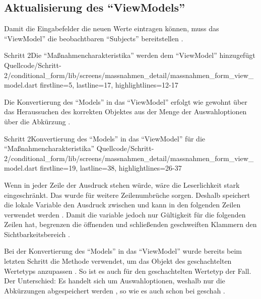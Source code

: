 \subsection{Aktualisierung des \enquote{ViewModels}}

Damit die Eingabefelder die neuen Werte eintragen können, muss das \enquote{ViewModel} die beobachtbaren \enquote{Subjects} bereitstellen . 

\begin{alexlisting}{Schritt 2}{Die \enquote{Maßnahmencharakteristika} werden dem \enquote{ViewModel} hinzugefügt}
  {Quellcode/Schritt-2/conditional_form/lib/screens/massnahmen_detail/massnahmen_form_view_model.dart}
  {firstline=5, lastline=17, highlightlines={12-17}}
  \label{lst:Schritt2MassnahmencharakteristikaWerdenDemViewModelHinzugefuegt}
\end{alexlisting}


Die Konvertierung des \enquote{Models} in das \enquote{ViewModel} erfolgt wie gewohnt über das Heraussuchen des korrekten Objektes aus der Menge der Auswahloptionen über die Abkürzung .

\begin{alexlisting}{Schritt 2}{Konvertierung des \enquote{Models} in das \enquote{ViewModel} für die \enquote{Maßnahmencharakteristika}}
  {Quellcode/Schritt-2/conditional_form/lib/screens/massnahmen_detail/massnahmen_form_view_model.dart}
  {firstline=19, lastline=38, highlightlines={26-37}}
  \label{lst:Schritt2KonvertierungDesModelsInDasViewModel}
\end{alexlisting}

Wenn in jeder Zeile der Ausdruck  stehen würde, wäre die Leserlichkeit stark eingeschränkt. Das wurde für weitere Zeilenumbrüche sorgen. Deshalb speichert die lokale Variable  den Ausdruck zwischen und kann in den folgenden Zeilen verwendet werden .
Damit die variable  jedoch nur Gültigkeit für die folgenden Zeilen hat, begrenzen die öffnenden und schließenden geschweiften Klammern den Sichtbarkeitsbereich .

Bei der Konvertierung des \enquote{Models} in das \enquote{ViewModel} wurde bereits beim letzten Schritt die Methode  verwendet, um das Objekt des geschachtelten Wertetyps  anzupassen . So ist es auch für den geschachtelten Wertetyp  der Fall. Der Unterschied: Es handelt sich um Auswahloptionen, weshalb nur die Abkürzungen abgespeichert werden , so wie es auch schon bei  geschah .

